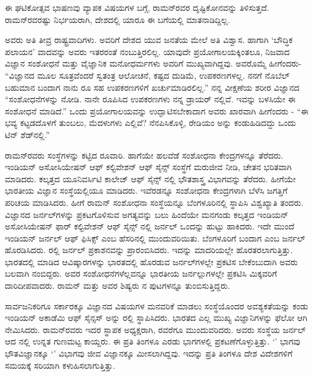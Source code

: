 ಈ ಘಟಿಕೋತ್ಸವ ಭಾಷಣವು ವ್ಯಾಪಕ ವಿಷಯಗಳ ಬಗ್ಗೆ, ರಾಮನ್‍ರವರ ದೃಷ್ಟಿಕೋನವನ್ನು ತಿಳಿಸುತ್ತದೆ. ರಾಮನ್‍ರವರಷ್ಟು ನಿರ್ಭಯರಾಗಿ, ದೇಶದಲ್ಲಿ ಯಾರೂ ಈ ಬಗೆಯಲ್ಲಿ ಮಾತನಾಡಿದ್ದಿಲ್ಲ.

ಅವರು ಅತಿ ತೀವ್ರ ರಾಷ್ಟ್ರವಾದಿಗಳು. ಅವರಿಗೆ ದೇಶದ ಯುವ ಜನತೆಯ ಮೇಲೆ ಅತಿ ವಿಶ್ವಾಸ. ಹಾಗಾಗಿ ‘ಬೌದ್ಧಿಕ ಪಲಾಯನ’ ವಾದವನ್ನು ಅವರು ಇತರರಂತೆ ನಂಬುತ್ತಿರಲಿಲ್ಲ. ಯಾವುದೇ ಪ್ರಯೋಗಾಲಯಕ್ಕಿಂತಲೂ, ನಿಜವಾದ ವಿಜ್ಞಾನ ಸಂಶೋಧನೆ ಮತ್ತು ವೈಜ್ಞಾನಿಕ ಮನೋಧರ್ಮಗಳು ಅವರಿಗೆ ಮುಖ್ಯವಾಗಿದ್ದವು. ಅವರೊಮ್ಮೆ ಹೀಗೆಂದರು- “ವಿಜ್ಞಾನದ ಮೂಲ ಸೂತ್ರವೆಂದರೆ ಸ್ವತಂತ್ರ ಆಲೋಚನೆ, ಕಷ್ಟದ ದುಡಿಮೆ, ಉಪಕರಣಗಳಲ್ಲ. ನನಗೆ ನೊಬೆಲ್ ಬಹುಮಾನ ಬಂದಾಗ ನಾನು  ರೂ ಸಹ ಉಪಕರಣಗಳಿಗೆ ಖರ್ಚುಮಾಡಿರಲಿಲ್ಲ.” ನನ್ನ ವೀಕ್ಷಣೆಯ ಶರೀರ ವಿಜ್ಞಾನದ “ಸಂಶೋಧನೆಗಳನ್ನು ನೋಡಿ. ನಾನೇ ರೂಪಿಸಿದ ಉಪಕರಣಗಳು ನನ್ನ ಡ್ರಾಯರ್ ನಲ್ಲಿವೆ. ಇವನ್ನು ಬಳಸಿಯೇ ಈ ಸಂಶೋಧನೆ ಮಾಡಿದೆ.” ಒಂದು ಪ್ರಯೋಗಾಲಯವನ್ನು ಉದ್ಘಾಟಿಸಬೇಕಾದಾಗ ಅವರು ಖಾರವಾಗಿ ಹೀಗೆಂದರು - “ಈ ಭವ್ಯ ಕಟ್ಟಡದೊಳಗೆ ತುಂಬಲು, ಮೆದಳುಗಳು ಎಲ್ಲಿವೆ? ನೆನಪಿಸಿಕೊಳ್ಳಿ, ರೇಡಿಯಂ ಅನ್ನು ಕಂಡುಹಿಡಿದದ್ದು ಒಂದು ಟಿನ್ ಶೆಡ್‍ನಲ್ಲಿ.”



ರಾಮನ್‍ರವರು ಸಂಸ್ಥೆಗಳನ್ನು ಕಟ್ಟಿದ ರೂವಾರಿ. ಹಾಗೆಯೇ ಹಲವೆಡೆ ಸಂಶೋಧನಾ ಕೇಂದ್ರಗಳನ್ನೂ ತೆರೆದರು. ಇಂಡಿಯನ್ ಅಸೋಸಿಯೇಷನ್ ಆಫ್ ಕಲ್ಟಿವೇಶನ್ ಆಫ್ ಸೈನ್ಸ್ ಸಂಸ್ಥೆಗೆ ಮರುಜೀವ ನೀಡಿ, ಚೇತನ ಭರಿತವಾಗಿ ಮಾಡಿದರು. ಕಲ್ಕತ್ತದ ಯೂನಿವರ್ಸಿಟಿ ಕಾಲೇಜ್ ಆಫ್ ಸೈನ್ಸ್ ನಲ್ಲಿ ಭೌತಶಾಸ್ತ್ರ ವಿಭಾಗವನ್ನು ತೆರೆದರು. ಹೀಗೆಯೇ ಭಾರತೀಯ ವಿಜ್ಞಾನ ಸಂಸ್ಥೆಯಲ್ಲಿಯೂ ಮಾಡಿದರು. ಇವೆರಡನ್ನೂ ಸಂಶೋಧನಾ ಕೇಂದ್ರಗಳಾಗಿ ಬೆಳೆಸಿ ಜಗತ್ತಿಗೆ ಪರಿಚಯ ಮಾಡಿಸಿದರು. ಹೀಗೆ ರಾಮನ್ ಸಂಶೋಧನಾ ಸಂಸ್ಥೆಯನ್ನೂ ಬೆಂಗಳೂರಿನಲ್ಲಿ ಸ್ಥಾಪಿಸಿ ವಿಶ್ವಖ್ಯಾತಿ ತಂದರು. ವಿಜ್ಞಾನದ ಜರ್ನಲ್‍ಗಳನ್ನು ಪ್ರಕಟಗೊಳಿಸುವ ಅಗತ್ಯವನ್ನು ಬಲು ಹಿಂದೆಯೇ ಮನಗಂಡು ಕಲ್ಕತ್ತದ ಇಂಡಿಯನ್ ಅಸೋಸಿಯೇಷನ್ ಫಾರ್ ಕಲ್ಟಿವೇಶನ್ ಆಫ್ ಸೈನ್ಸ್ ‍ನಲ್ಲಿ ಜರ್ನಲ್ ಒಂದನ್ನು ಹುಟ್ಟು ಹಾಕಿದರು. ಇದೇ ಮುಂದೆ ಇಂಡಿಯನ್ ಜರ್ನಲ್ ಆಫ್ ಫಿಸಿಕ್ಸ್ ಎಂಬ ಹೆಸರಿನಲ್ಲಿ ಮುಂದುವರಿಯಿತು. ಬೆಂಗಳೂರಿಗೆ ಬಂದಾಗ \textit{} ಎಂಬ ಜರ್ನಲ್ ಹೊರಡಿಸಿದರು. ರಲ್ಲಿ \textit{} ಜರ್ನಲ್ ಪ್ರಕಾಶನವನ್ನು ಪ್ರಾರಂಬಿಸಿದರು. ಇದನ್ನು \textit{} ಮಾದರಿಯಲ್ಲೇ ಹೊರತರಲಾಗುತ್ತಿತ್ತು. ಭಾರತದಲ್ಲಿ ಮಾಡಿದ ಆವಿಷ್ಕಾರಗಳನ್ನು ಭಾರತದಲ್ಲಿ ಹೊರಡುವ ಜರ್ನಲ್‍ಗಳಲ್ಲೇ ಪ್ರಕಟಿಸ ಬೇಕೆಂಬುದಾಗಿ ಅವರು ಬಲವಾಗಿ ನಂಬಿದ್ದರು. ಅವರ ಸಂಶೋಧನೆಗಳೆಲ್ಲವನ್ನೂ ಭಾರತೀಯ ಜರ್ನಲ್ಲುಗಳಲ್ಲೇ ಪ್ರಕಟಿಸಿ ಮಿಕ್ಕವರಿಗೆ ದಾರಿದೀಪವಾದರು. ರಾಮನ್ ಮತ್ತು ಅವರ ಶಿಷ್ಯರು \textit{} ನ ಪುಟಗಳನ್ನೂ ತುಂಬಿಸುತ್ತಿದ್ದರು.

ಸಾರ್ವಜನಿಕರಿಗೂ ಸರ್ಕಾರಕ್ಕೂ ವಿಜ್ಞಾನದ ವಿಷಯಗಳ ಮನವರಿಕೆ ಮಾಡಲು ಸಂಸ್ಥೆಯೊಂದರ ಅವಶ್ಯಕತೆಯನ್ನು ಕಂಡು ಇಂಡಿಯನ್ ಅಕಾಡೆಮಿ ಆಫ್ ಸೈನ್ಸಸ್ ಅನ್ನು ರಲ್ಲಿ ಸ್ಥಾಪಿಸಿದರು. ಭಾರತದ ಎಲ್ಲ ಮುಖ್ಯ ವಿಜ್ಞಾನಿಗಳನ್ನು ಫೆಲೋ ಆಗಿ ನೇಮಿಸಿದರು. ರಾಮನ್‍ರವರು ಇದರ ಸ್ಥಾಪಕ ಅಧ್ಯಕ್ಷರಾಗಿ,  ರವರೆಗೂ ಮುಂದುವರಿದರು. ಅವರು ಸಂಸ್ಥೆಯ ಜರ್ನಲ್ ಆದ  ನಲ್ಲಿ ಉನ್ನತ ಗುಣಮಟ್ಟ ಕಾಯ್ದರು. ಈ  ಪ್ರತಿ ತಿಂಗಳೂ ಎರಡು ಭಾಗಗಳಲ್ಲಿ ಪ್ರಕಟಣೆಗೊಳ್ಳುತ್ತಿತ್ತು. ‘’ ಭಾಗವು ಭೌತವಿಜ್ಞಾನಕ್ಕೂ ‘’ ವಿಭಾಗವು ಜೀವ ವಿಜ್ಞಾನಕ್ಕೂ ಮೀಸಲಾಗಿದ್ದವು. ಇದನ್ನು ಪ್ರತಿ ತಿಂಗಳೂ ದೇಶ ವಿದೇಶಗಳಿಗೆ ಸಮಯಕ್ಕೆ ಸರಿಯಾಗಿ ಕಳುಹಿಸಲಾಗುತ್ತಿತ್ತು.


